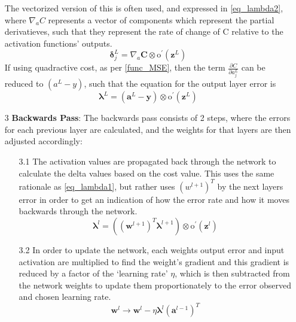 \documentclass[a4paper,11pt,oneside]{article}
\theoremstyle{plain}
\theoremstyle{definition}
\begin{document}
\begin{itemize}
		The vectorized version of this is often used, and expressed in \eqref{eq_lambda2}, where $\nabla_a C$ represents a vector of components which represent the partial derivatieves, such that they represent the rate of change of C relative to the activation functions' outputs.
		\begin{equation}\label{eq_lambda2}
		\mathbf{\delta}_{j}^{L}=\nabla_a \mathbf{C} \otimes \mathrm{o}^{\prime}(\mathbf{z}^L)
		\end{equation}
		If using quadractive cost, as per \ref{func_MSE}, then the term $\frac{\partial C}{\partial a_{j}^{L}}$ can be reduced to $(a^L - y)$, such that the equation for the output layer error is
		\begin{equation}\label{eq_lambda3}
		\mathbf{\lambda}^L = (\mathbf{a}^L - \mathbf{y}) \otimes \mathrm{o}^{\prime}(\mathbf{z}^L)
		\end{equation}
		\newline		
		\item [3] \textbf{Backwards Pass}: The backwards pass consists of 2 steps, where the errors for each previous layer are calculated, and the weights for that layers are then adjusted accordingly:
		\begin{itemize}
			\item [3.1] The activation values are propagated back through the network to calculate the delta values based on the cost value. This uses the same rationale as \eqref{eq_lambda1}, but rather uses $(w^{l+1})^T$ by the next layers error in order to get an indication of how the error rate and how it moves backwards through the network.
			\begin{equation}\label{eq_lambda4}
			\mathbf{\lambda}^l = ((\mathbf{w}^{l+1})^T\mathbf{\lambda}^{l+1})  \otimes \mathrm{o}^{\prime}(\mathbf{z}^l)
			\end{equation}
			\item [3.2] In order to update the network, each weights output error and input activation are multiplied to find the weight’s gradient and this gradient is reduced by a factor of the ‘learning rate’ $\eta$, which is then subtracted from the network weights to update them proportionately to the error observed and chosen learning rate.
			\begin{equation}\label{eq_bp_weightupdate}
			\mathbf{w}^l \rightarrow \mathbf{w}^l - {\eta}\mathbf{\lambda}^{l} (\mathbf{a}^{l - 1})^T
			\end{equation}
		\end{itemize}
		
	\end{itemize}
	
\end{document}
